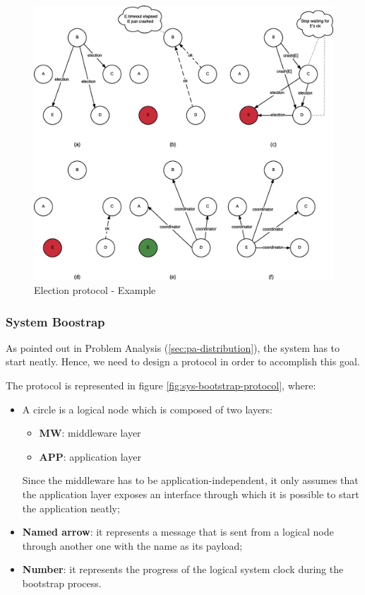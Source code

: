 \begin{figure}[H]
  \centering
  \includegraphics[width=\columnwidth]{images/solution/election.eps}
  \caption{Election protocol - Example}
  \label{fig:election-protocol-ex}
\end{figure}

\subsubsection{System Boostrap}
As pointed out in Problem Analysis (\ref{sec:pa-distribution}), the system has
to start neatly. Hence, we need to design a protocol in order to accomplish
this goal.

The protocol is represented in figure \ref{fig:sys-bootstrap-protocol}, where:

\begin{itemize}
  \item A circle is a logical node which is composed of two layers:
    \begin{itemize}
      \item \textbf{MW}:  middleware layer
      \item \textbf{APP}: application layer
  \end{itemize}
    Since the middleware has to be application-independent, it only assumes
    that the application layer exposes an interface through which it is
    possible to start the application neatly;
  \item \textbf{Named arrow}: it represents a message that is sent from a
logical node through another one with the name as its payload;
  \item \textbf{Number}: it represents the progress of the logical system clock
during the bootstrap process.
\end{itemize}

